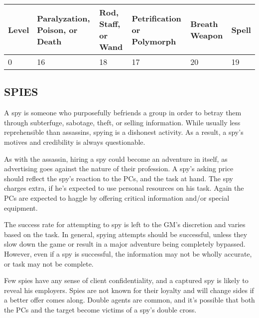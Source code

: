 \noindent
\begin{minipage}{\columnwidth}

\label{zerolevelsaves}
\noindent
\begin{tabular}{|m{}|m{}|m{}|m{}|m{}|m{}|}
\hline
Level	& Paralyzation, Poison, or Death	& Rod, Staff, or Wand	& Petrification or Polymorph	& Breath Weapon	& Spell \\
\hline\hline
\rowcolor[gray]{.9}0 & 16	& 18	& 17	& 20	& 19 \\
\hline
\end{tabular}

\end{minipage}

\begin{multicols}{2} 

\subsection{SPIES}

A spy is someone who purposefully befriends a group in order to betray them through subterfuge, sabotage, theft, or selling information.  While usually less reprehensible than assassins, spying is a dishonest activity.  As a result, a spy's motives and credibility is always questionable.

As with the assassin, hiring a spy could become an adventure in itself, as advertising goes against the nature of their profession.  A spy's asking price should reflect the spy's reaction to the PCs, and the task at hand.  The spy charges extra, if he's expected to use personal resources on his task.  Again the PCs are expected to haggle by offering critical information and/or special equipment.

The success rate for attempting to spy is left to the GM's discretion and varies based on the task.  In general, spying attempts should be successful, unless they slow down the game or result in a major adventure being completely bypassed.  However, even if a spy is successful, the information may not be wholly accurate, or task may not be complete. 

Few spies have any sense of client confidentiality, and a captured spy is likely to reveal his employers.  Spies are not known for their loyalty and will change sides if a better offer comes along.  Double agents are common, and it's possible that both the PCs and the target become victims of a spy's double cross. 


\end{multicols}
